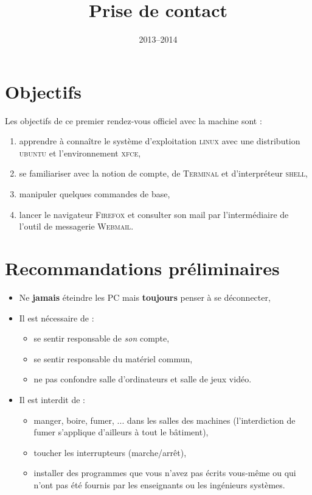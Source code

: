 \documentclass[a4paper,11pt]{article}
\title{Prise de contact}
\date{2013--2014}
\newcommand{\netscape}{\textsc{Firefox}\xspace}
\newcommand{\term}{\textsc{Terminal}\xspace}
\newcommand{\linux}{\textsc{linux}\xspace}
\newcommand{\ubuntu}{\textsc{ubuntu}\xspace}
\newcommand{\gnome}{\textsc{xfce}\xspace}
\newcommand{\shell}{\textsc{shell}\xspace}
\begin{document}

\maketitle

\section*{Objectifs}

Les objectifs de ce premier rendez-vous officiel avec la machine sont :

\begin{enumerate}
  \item apprendre à connaître
        le système d'exploitation \linux avec une distribution \ubuntu
        et l'environnement \gnome,
  \item se familiariser avec la notion de compte, de \term et
        d'interpréteur \shell,
  \item manipuler quelques commandes de base,
  \item lancer le navigateur \netscape et consulter son mail par
        l'intermédiaire de l'outil de messagerie \textsc{Webmail}.
\end{enumerate}

\section*{Recommandations préliminaires}

\begin{itemize}
  \item Ne \textbf{jamais} éteindre les PC mais
        \textbf{toujours} penser à se déconnecter,
  \item Il est nécessaire de :
        \begin{itemize}
          \item se sentir responsable de \textit{son} compte,
          \item se sentir responsable du matériel commun,
          \item ne pas confondre salle d'ordinateurs et salle de jeux vidéo.
        \end{itemize} 
  \item Il est interdit de :
        \begin{itemize}
          \item manger, boire, fumer, ... dans les salles des machines
                (l'interdiction de fumer s'applique d'ailleurs à tout le
                bâtiment),
          \item toucher les interrupteurs (marche/arrêt),
          \item installer des programmes que vous n'avez pas écrits vous-même
                ou qui n'ont pas été fournis par les enseignants ou les
                ingénieurs systèmes.
        \end{itemize}
\end{itemize}
\end{document}
